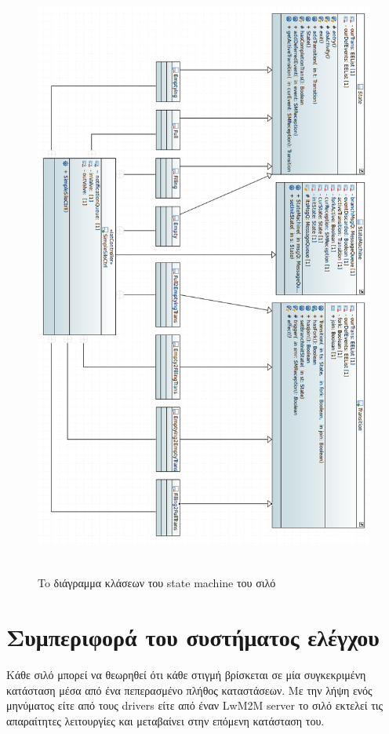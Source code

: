 \begin{figure}[htbp]
	\centering
		\includegraphics[height=20cm,width=14cm]{Figures/23.png}
	\caption{To διάγραμμα κλάσεων του state machine του σιλό}	
\end{figure}

\section{Συμπεριφορά του συστήματος ελέγχου}
Κάθε σιλό μπορεί να θεωρηθεί ότι κάθε στιγμή βρίσκεται σε μία συγκεκριμένη κατάσταση μέσα από ένα πεπερασμένο πλήθος καταστάσεων. Με την λήψη ενός μηνύματος είτε από τους drivers είτε από έναν LwM2M server το σιλό εκτελεί τις απαραίτητες λειτουργίες και μεταβαίνει στην επόμενη κατάσταση του. 

